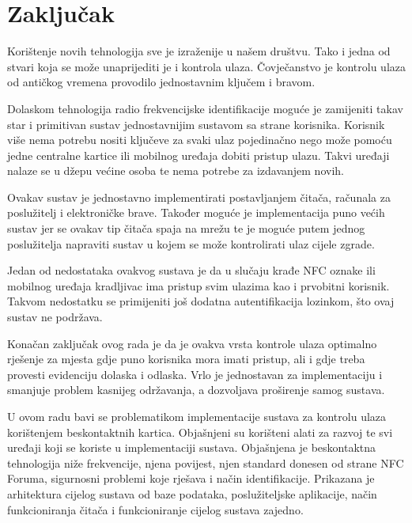 \documentclass[times, utf8, zavrsni]{fer}
\begin{document}
\chapter{Zaključak}
Korištenje novih tehnologija sve je izraženije u našem društvu. Tako i jedna od stvari koja se može unaprijediti je i kontrola ulaza. Čovječanstvo je kontrolu ulaza od antičkog vremena provodilo jednostavnim ključem i bravom.\par
Dolaskom tehnologija radio frekvencijske identifikacije moguće je zamijeniti takav star i primitivan sustav jednostavnijim sustavom sa strane korisnika. Korisnik više nema potrebu nositi ključeve za svaki ulaz pojedinačno nego može pomoću jedne centralne kartice ili mobilnog uređaja dobiti pristup ulazu. Takvi uređaji nalaze se u džepu većine osoba te nema potrebe za izdavanjem novih.\par
Ovakav sustav je jednostavno implementirati postavljanjem čitača, računala za poslužitelj i elektroničke brave. Također moguće je implementacija puno većih sustav jer se ovakav tip čitača spaja na mrežu te je moguće putem jednog poslužitelja napraviti sustav u kojem se može kontrolirati ulaz cijele zgrade.\par
Jedan od nedostataka ovakvog sustava je da u slučaju krađe NFC oznake ili mobilnog uređaja kradljivac ima pristup svim ulazima kao i prvobitni korisnik. Takvom nedostatku se primijeniti još dodatna autentifikacija lozinkom, što ovaj sustav ne podržava.\par
Konačan zaključak ovog rada je da je ovakva vrsta kontrole ulaza optimalno rješenje za mjesta gdje puno korisnika mora imati pristup, ali i gdje treba provesti evidenciju dolaska i odlaska. Vrlo je jednostavan za implementaciju i smanjuje problem kasnijeg održavanja, a dozvoljava proširenje samog sustava.





\begin{sazetak}
U ovom radu bavi se problematikom implementacije sustava za kontrolu ulaza korištenjem beskontaktnih kartica. Objašnjeni su korišteni alati za razvoj te svi uređaji koji se koriste u implementaciji sustava. Objašnjena je beskontaktna tehnologija niže frekvencije, njena povijest, njen standard donesen od strane NFC Foruma, sigurnosni problemi koje rješava i način identifikacije. Prikazana je arhitektura cijelog sustava od baze podataka, poslužiteljske aplikacije, način funkcioniranja čitača i funkcioniranje cijelog sustava zajedno.

\end{sazetak}
\end{document}

